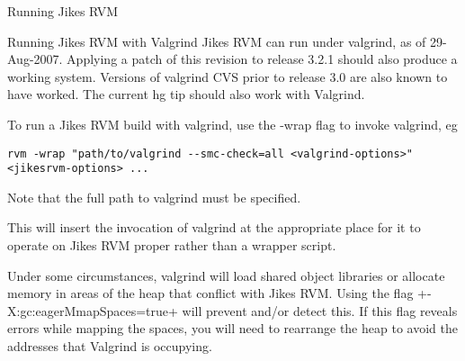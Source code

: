 \begin{section}{Running Jikes RVM}
\begin{subsection}{Running Jikes RVM with Valgrind}
Jikes RVM can run under valgrind, as of 29-Aug-2007. Applying a patch of this revision to release 3.2.1 should also produce a working system.  Versions of valgrind CVS prior to release 3.0 are also known to have worked. The current hg tip should also work with Valgrind.

To run a Jikes RVM build with valgrind, use the -wrap flag to invoke valgrind, eg
\begin{lstlisting}
rvm -wrap "path/to/valgrind --smc-check=all <valgrind-options>" <jikesrvm-options> ...
\end{lstlisting}

Note that the full path to valgrind must be specified.

This will insert the invocation of valgrind at the appropriate place for it to operate on Jikes RVM proper rather than a wrapper script. 

Under some circumstances, valgrind will load shared object libraries or allocate memory in areas of the heap that conflict with Jikes RVM.  Using the flag \spverb+-X:gc:eagerMmapSpaces=true+ will prevent and/or detect this.  If this flag reveals errors while mapping the spaces, you will need to rearrange the heap to avoid the addresses that Valgrind is occupying.

\end{subsection}

\end{section}
